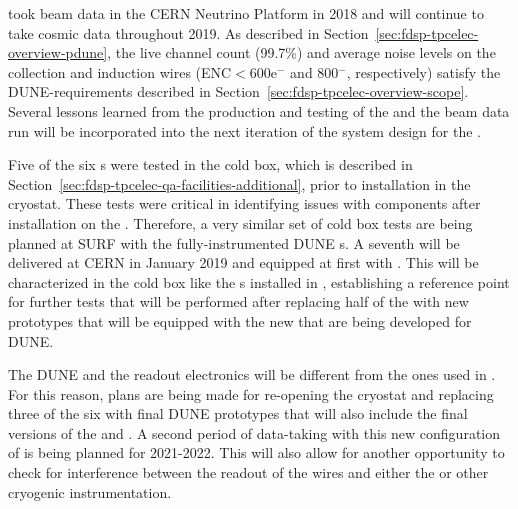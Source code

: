  took beam data in the CERN Neutrino Platform in 2018 and will continue
to take cosmic data throughout 2019. As described in Section~\ref{sec:fdsp-tpcelec-overview-pdune}, 
the live channel count (99.7\%) and average noise levels on the collection and induction wires 
(ENC$<$600e$^-$ and 800$^-$, respectively) satisfy the DUNE-\single requirements described 
in Section~\ref{sec:fdsp-tpcelec-overview-scope}. Several lessons learned from the production 
and testing of the  and the  beam data run will be incorporated into the 
next iteration of the system design for the .


Five of the six s were tested in the  cold box, which is described in
Section~\ref{sec:fdsp-tpcelec-qa-facilities-additional}, prior to installation in the cryostat. 
These tests were critical in identifying issues with  components after installation 
on the . Therefore, a very similar set of cold box tests are being planned at SURF 
with the fully-instrumented DUNE s. A seventh  will be delivered
at CERN in January 2019 and equipped at first with  . This
 will be characterized in the cold box like the s installed
in , establishing a reference point for further tests that will be
performed after replacing half of the  with new prototypes that will 
be equipped with the new  that are being developed for DUNE. 

The DUNE  and the readout electronics will be different from the ones used 
in . For this reason, plans are being made for re-opening the  cryostat 
and replacing three of the six  with final DUNE prototypes that will also include 
the final versions of the  and . A second period of data-taking 
with this new configuration of  is being planned for 2021-2022. This will also 
allow for another opportunity to check for interference between the readout of the  
wires and either the  or other cryogenic instrumentation.


